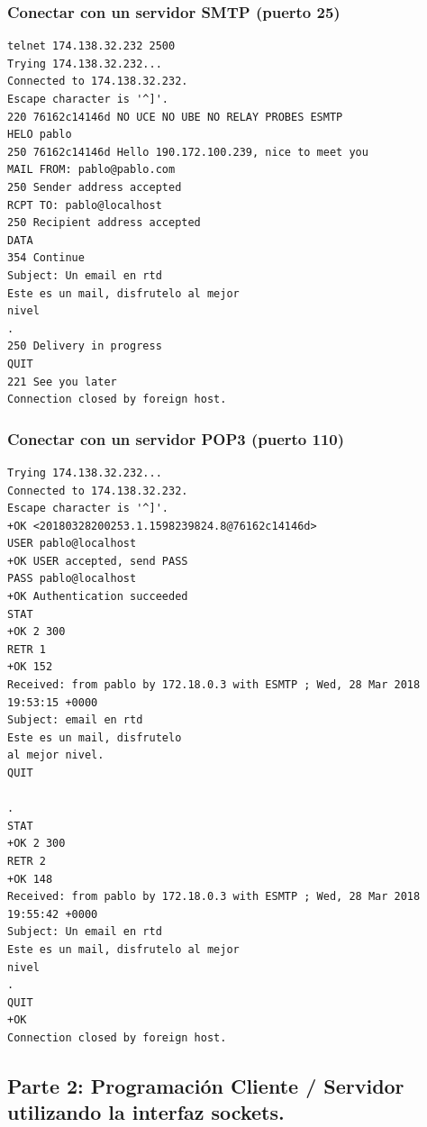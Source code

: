 \documentclass[11pt]{article}
\begin{document}
    \hypertarget{conectar-con-un-servidor-smtp-puerto-25}{%
\subsubsection{Conectar con un servidor SMTP (puerto
25)}\label{conectar-con-un-servidor-smtp-puerto-25}}

\begin{verbatim}
telnet 174.138.32.232 2500
Trying 174.138.32.232...
Connected to 174.138.32.232.
Escape character is '^]'.
220 76162c14146d NO UCE NO UBE NO RELAY PROBES ESMTP
HELO pablo
250 76162c14146d Hello 190.172.100.239, nice to meet you
MAIL FROM: pablo@pablo.com
250 Sender address accepted
RCPT TO: pablo@localhost 
250 Recipient address accepted
DATA
354 Continue
Subject: Un email en rtd
Este es un mail, disfrutelo al mejor
nivel
.
250 Delivery in progress
QUIT
221 See you later
Connection closed by foreign host.
\end{verbatim}

\hypertarget{conectar-con-un-servidor-pop3-puerto-110}{%
\subsubsection{Conectar con un servidor POP3 (puerto
110)}\label{conectar-con-un-servidor-pop3-puerto-110}}

\begin{verbatim}
Trying 174.138.32.232...
Connected to 174.138.32.232.
Escape character is '^]'.
+OK <20180328200253.1.1598239824.8@76162c14146d>
USER pablo@localhost
+OK USER accepted, send PASS
PASS pablo@localhost
+OK Authentication succeeded
STAT
+OK 2 300
RETR 1
+OK 152
Received: from pablo by 172.18.0.3 with ESMTP ; Wed, 28 Mar 2018 19:53:15 +0000
Subject: email en rtd
Este es un mail, disfrutelo
al mejor nivel.
QUIT

.
STAT
+OK 2 300
RETR 2
+OK 148
Received: from pablo by 172.18.0.3 with ESMTP ; Wed, 28 Mar 2018 19:55:42 +0000
Subject: Un email en rtd
Este es un mail, disfrutelo al mejor
nivel
.
QUIT
+OK 
Connection closed by foreign host.
\end{verbatim}

    \hypertarget{parte-2-programaciuxf3n-cliente-servidor-utilizando-la-interfaz-sockets.}{%
\subsection{Parte 2: Programación Cliente / Servidor utilizando la
interfaz
sockets.}\label{parte-2-programaciuxf3n-cliente-servidor-utilizando-la-interfaz-sockets.}}
\end{document}
